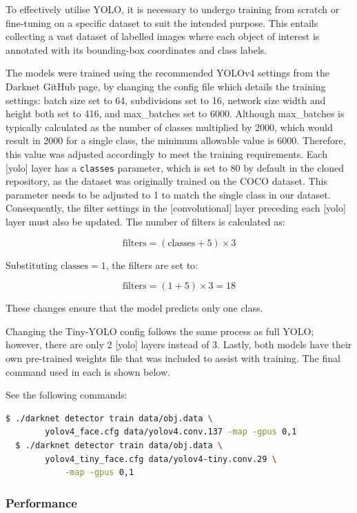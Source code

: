 To effectively utilise YOLO, it is necessary to undergo training from scratch or fine-tuning on a specific dataset to suit the intended purpose. This entails collecting a vast dataset of labelled images where each object of interest is annotated with its bounding-box coordinates and class labels.

The models were trained using the recommended YOLOv4 settings from the Darknet GitHub page, by changing the config file which details the training settings: batch size set to 64, subdivisions set to 16, network size width and height both set to 416, and max\_batches set to 6000. Although max\_batches is typically calculated as the number of classes multiplied by 2000, which would result in 2000 for a single class, the minimum allowable value is 6000. Therefore, this value was adjusted accordingly to meet the training requirements.
Each [yolo] layer has a \texttt{classes} parameter, which is set to 80 by default in the cloned repository, as the dataset was originally trained on the COCO dataset. This parameter needs to be adjusted to 1 to match the single class in our dataset. Consequently, the filter settings in the [convolutional] layer preceding each [yolo] layer must also be updated. The number of filters is calculated as:

\[
\text{filters} = (\text{classes} + 5) \times 3
\]

Substituting \(\text{classes} = 1\), the filters are set to:

\[
\text{filters} = (1 + 5) \times 3 = 18
\]

These changes ensure that the model predicts only one class.

Changing the Tiny-YOLO config follows the same process as full YOLO; however, there are only 2 [yolo] layers instead of 3. Lastly, both models have their own pre-trained weights file that was included to assist with training. The final command used in each is shown below.

\noindent{} See the following commands:
\begin{lstlisting}[language=bash]
  $ ./darknet detector train data/obj.data \
        yolov4_face.cfg data/yolov4.conv.137 -map -gpus 0,1
  $ ./darknet detector train data/obj.data \
        yolov4_tiny_face.cfg data/yolov4-tiny.conv.29 \
            -map -gpus 0,1
\end{lstlisting}

\subsubsection{Performance}


